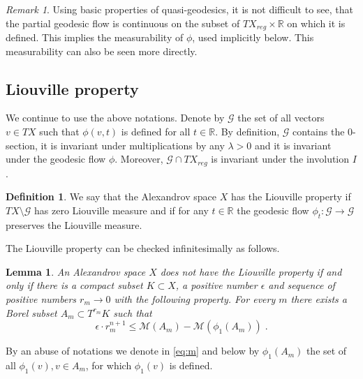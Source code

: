 \documentclass[12pt,leqno]{amsart}
\numberwithin{equation}{section}
\newtheorem{lem}[thm]{Lemma}
\theoremstyle{definition}
\newtheorem{defn}[thm]{Definition}%
\theoremstyle{remark}
\newtheorem{rem}[thm]{Remark}
\newcommand{\R}{\mathbb{R}}
\begin{document}
\begin{rem}  Using basic properties of quasi-geodesics, it is not difficult  to see,  that the partial  geodesic
flow  is continuous  on the subset  of $TX_{reg}\times \R$ on which it is defined. This implies the measurability of $\mathcal \phi$, used implicitly below. 
This measurability can also be seen more directly.
\end{rem}



\subsection{Liouville property}
We continue to use the above notations.
 Denote by $\mathcal G$ the set of all vectors $v\in TX $ such that $\phi (v,t)$ is defined for all $t\in \R$. By definition, $\mathcal G$ contains the $0$-section, it
 is invariant under multiplications by any $\lambda >0$  and it is invariant under the geodesic flow $\phi$. Moreover, $\mathcal G\cap TX_{reg}$ is invariant under the involution $I$.
  \begin{defn}
 We say that the Alexandrov space $X$ has the Liouville property if  $TX\setminus \mathcal G$ has zero Liouville measure  and if
for any $t\in \R$ the geodesic flow $\phi _t :\mathcal G\to \mathcal G$ preserves the Liouville measure.
 \end{defn}

The Liouville property can be checked infinitesimally as follows.

\begin{lem} \label{infini}
An Alexandrov space $X$ does not have the Liouville property if and only if there is a compact subset $K\subset X$, a positive number
$\epsilon$ and sequence of positive numbers  $r_m \to 0$  with the following property.
 For every  $m$ there exists a Borel subset $A_m\subset T^{r_ m} K$ such that
 \begin{equation} \label{eq:m}
\epsilon \cdot r_m^{n +1} \leq \mathcal M (A_m) -\mathcal M (\phi _1 (A_m)) \;.
\end{equation}
\end{lem}
By an abuse of notations we denote in \eqref{eq:m}  and below by  $\phi_1 (A_m)$ the set of all $\phi _1(v), v\in A_m$, for which
$\phi _1(v)$ is defined.
\end{document}

